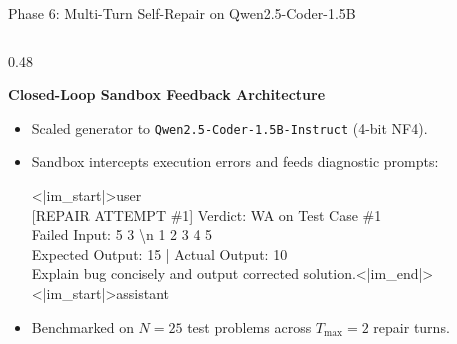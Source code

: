 \documentclass[aspectratio=169,10pt]{beamer}
\begin{document}
\begin{frame}{Phase 6: Multi-Turn Self-Repair on Qwen2.5-Coder-1.5B}
  \begin{columns}[T]
    \begin{column}{0.48\textwidth}
      \begin{block}{\textbf{Closed-Loop Sandbox Feedback Architecture}}
        \begin{itemize}\itemsep=2pt\scriptsize
          \item Scaled generator to \texttt{Qwen2.5-Coder-1.5B-Instruct} (4-bit NF4).
          \item Sandbox intercepts execution errors and feeds diagnostic prompts:
            \begin{center}
              \tiny\ttfamily
              <|im\_start|>user\\
              {[REPAIR ATTEMPT \#1]} Verdict: WA on Test Case \#1\\
              Failed Input: 5 3 \textbackslash n 1 2 3 4 5\\
              Expected Output: 15 | Actual Output: 10\\
              Explain bug concisely and output corrected solution.<|im\_end|>\\
              <|im\_start|>assistant
            \end{center}
          \item Benchmarked on $N=25$ test problems across $T_{\max} = 2$ repair turns.
        \end{itemize}
      \end{block}
    \end{column}


\end{columns}
\end{frame}
\end{document}
